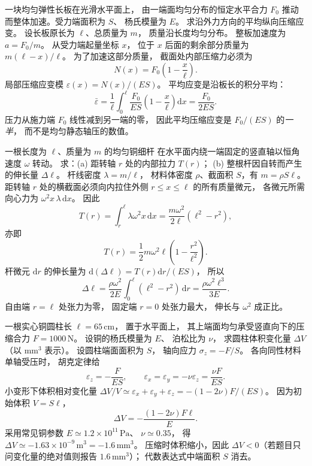 一块均匀弹性长板在光滑水平面上，
由一端面均匀分布的恒定水平合力 $F_0$
推动而整体加速。受力端面积为 $S$、
杨氏模量为 $E$。
求沿外力方向的平均纵向压缩应变。
\exsolution
设长板原长为 $\ell$、总质量为 $m$，
质量沿长度均匀分布。
整板加速度为 $a=F_0/m$。
从受力端起量坐标 $x$，
位于 $x$ 后面的剩余部分质量为
$m(\ell-x)/\ell$。
为了加速这部分质量，
截面处内部压缩力必须为
\[
N(x)=F_0\left(1-\frac{x}{\ell}\right).
\]
局部压缩应变模
$\varepsilon(x)=N(x)/(ES)$。
平均应变是沿板长的积分平均：
\[
\bar\varepsilon
=\frac1\ell\int_0^\ell
\frac{F_0}{ES}\left(1-\frac{x}{\ell}\right)\mathrm dx
=\boxed{\frac{F_0}{2ES}}.
\]
\excheck 压力从施力端 $F_0$ 线性减到另一端的零，
因此平均压缩应变是
$F_0/(ES)$ 的\emph{一半}，
而不是均匀静态轴压的数值。

一根长度为 $\ell$、质量为 $m$ 的均匀铜细杆
在水平面内绕一端固定的竖直轴以恒角速度
$\omega$ 转动。
求：(a) 距转轴 $r$ 处的内部拉力 $T(r)$；
(b) 整根杆因自转而产生的伸长量 $\Delta\ell$。
\exsolution
杆线密度 $\lambda=m/\ell$，
材料体密度 $\rho$、截面积 $S$，有
$m=\rho S\ell$。
距转轴 $r$ 处的横截面必须向内拉住外侧
$r\le x\le\ell$ 的所有质量微元，
各微元所需向心力为
$\omega^2x\,\lambda\,\mathrm dx$。
因此
\[
T(r)=\int_r^\ell\lambda\omega^2x\,\mathrm dx
=\frac{m\omega^2}{2\ell}(\ell^2-r^2),
\]
亦即
\[
\boxed{T(r)=\frac12m\omega^2\ell
\left(1-\frac{r^2}{\ell^2}\right)}.
\]
杆微元 $\mathrm dr$ 的伸长量为
$\mathrm d(\Delta\ell)=T(r)\mathrm dr/(ES)$，
所以
\[
\Delta\ell
=\frac{\rho\omega^2}{2E}\int_0^\ell
(\ell^2-r^2)\,\mathrm dr
=\boxed{\frac{\rho\omega^2\ell^3}{3E}}.
\]
\excheck 自由端 $r=\ell$ 处张力为零，
固定端 $r=0$ 处张力最大，
伸长与 $\omega^2$ 成正比。

一根实心铜圆柱长 $\ell=65\,\mathrm{cm}$，
置于水平面上，
其上端面均匀承受竖直向下的压缩合力
$F=1000\,\mathrm N$。
设铜的杨氏模量为 $E$、
泊松比为 $\nu$，
求圆柱体积变化量 $\Delta V$
（以 $\mathrm{mm^3}$ 表示）。
\exsolution
设圆柱端面面积为 $S$，
轴向应力 $\sigma_z=-F/S$。
各向同性材料单轴受压时，
胡克定律给
\[
\varepsilon_z=-\frac{F}{ES},\qquad
\varepsilon_x=\varepsilon_y=
-\nu\varepsilon_z=\frac{\nu F}{ES}.
\]
小变形下体积相对变化量
$\Delta V/V\simeq\varepsilon_x+\varepsilon_y+\varepsilon_z
=-(1-2\nu)F/(ES)$。
因为初始体积 $V=S\ell$，
\[
\boxed{\Delta V=-\frac{(1-2\nu)F\ell}{E}}.
\]
采用常见铜参数
$E\simeq1.2\times10^{11}\,\mathrm{Pa}$、
$\nu\simeq0.35$，
得
$\Delta V\simeq-1.63\times10^{-9}\,\mathrm{m^3}
=\boxed{-1.6\,\mathrm{mm^3}}$。
\excheck 压缩时体积缩小，因此
$\Delta V<0$（若题目只问变化量的绝对值则报告
$1.6\,\mathrm{mm^3}$）；
代数表达式中端面积 $S$ 消去。

